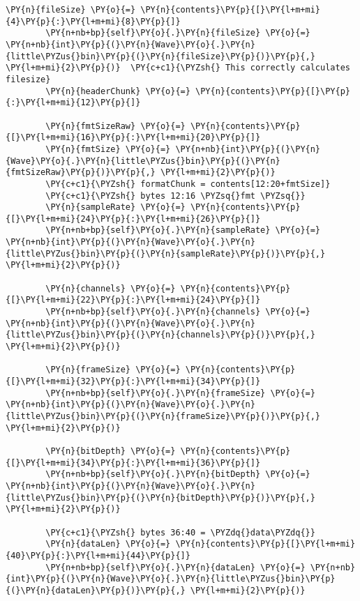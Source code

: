 \begin{Verbatim}[commandchars=\\\{\}]
        \PY{n}{fileSize} \PY{o}{=} \PY{n}{contents}\PY{p}{[}\PY{l+m+mi}{4}\PY{p}{:}\PY{l+m+mi}{8}\PY{p}{]}
        \PY{n+nb+bp}{self}\PY{o}{.}\PY{n}{fileSize} \PY{o}{=} \PY{n+nb}{int}\PY{p}{(}\PY{n}{Wave}\PY{o}{.}\PY{n}{little\PYZus{}bin}\PY{p}{(}\PY{n}{fileSize}\PY{p}{)}\PY{p}{,} \PY{l+m+mi}{2}\PY{p}{)}  \PY{c+c1}{\PYZsh{} This correctly calculates filesize}
        \PY{n}{headerChunk} \PY{o}{=} \PY{n}{contents}\PY{p}{[}\PY{p}{:}\PY{l+m+mi}{12}\PY{p}{]}

        \PY{n}{fmtSizeRaw} \PY{o}{=} \PY{n}{contents}\PY{p}{[}\PY{l+m+mi}{16}\PY{p}{:}\PY{l+m+mi}{20}\PY{p}{]}
        \PY{n}{fmtSize} \PY{o}{=} \PY{n+nb}{int}\PY{p}{(}\PY{n}{Wave}\PY{o}{.}\PY{n}{little\PYZus{}bin}\PY{p}{(}\PY{n}{fmtSizeRaw}\PY{p}{)}\PY{p}{,} \PY{l+m+mi}{2}\PY{p}{)}
        \PY{c+c1}{\PYZsh{} formatChunk = contents[12:20+fmtSize]}
        \PY{c+c1}{\PYZsh{} bytes 12:16 \PYZsq{}fmt \PYZsq{}}
        \PY{n}{sampleRate} \PY{o}{=} \PY{n}{contents}\PY{p}{[}\PY{l+m+mi}{24}\PY{p}{:}\PY{l+m+mi}{26}\PY{p}{]}
        \PY{n+nb+bp}{self}\PY{o}{.}\PY{n}{sampleRate} \PY{o}{=} \PY{n+nb}{int}\PY{p}{(}\PY{n}{Wave}\PY{o}{.}\PY{n}{little\PYZus{}bin}\PY{p}{(}\PY{n}{sampleRate}\PY{p}{)}\PY{p}{,} \PY{l+m+mi}{2}\PY{p}{)}

        \PY{n}{channels} \PY{o}{=} \PY{n}{contents}\PY{p}{[}\PY{l+m+mi}{22}\PY{p}{:}\PY{l+m+mi}{24}\PY{p}{]}
        \PY{n+nb+bp}{self}\PY{o}{.}\PY{n}{channels} \PY{o}{=} \PY{n+nb}{int}\PY{p}{(}\PY{n}{Wave}\PY{o}{.}\PY{n}{little\PYZus{}bin}\PY{p}{(}\PY{n}{channels}\PY{p}{)}\PY{p}{,} \PY{l+m+mi}{2}\PY{p}{)}

        \PY{n}{frameSize} \PY{o}{=} \PY{n}{contents}\PY{p}{[}\PY{l+m+mi}{32}\PY{p}{:}\PY{l+m+mi}{34}\PY{p}{]}
        \PY{n+nb+bp}{self}\PY{o}{.}\PY{n}{frameSize} \PY{o}{=} \PY{n+nb}{int}\PY{p}{(}\PY{n}{Wave}\PY{o}{.}\PY{n}{little\PYZus{}bin}\PY{p}{(}\PY{n}{frameSize}\PY{p}{)}\PY{p}{,} \PY{l+m+mi}{2}\PY{p}{)}

        \PY{n}{bitDepth} \PY{o}{=} \PY{n}{contents}\PY{p}{[}\PY{l+m+mi}{34}\PY{p}{:}\PY{l+m+mi}{36}\PY{p}{]}
        \PY{n+nb+bp}{self}\PY{o}{.}\PY{n}{bitDepth} \PY{o}{=} \PY{n+nb}{int}\PY{p}{(}\PY{n}{Wave}\PY{o}{.}\PY{n}{little\PYZus{}bin}\PY{p}{(}\PY{n}{bitDepth}\PY{p}{)}\PY{p}{,} \PY{l+m+mi}{2}\PY{p}{)}

        \PY{c+c1}{\PYZsh{} bytes 36:40 = \PYZdq{}data\PYZdq{}}
        \PY{n}{dataLen} \PY{o}{=} \PY{n}{contents}\PY{p}{[}\PY{l+m+mi}{40}\PY{p}{:}\PY{l+m+mi}{44}\PY{p}{]}
        \PY{n+nb+bp}{self}\PY{o}{.}\PY{n}{dataLen} \PY{o}{=} \PY{n+nb}{int}\PY{p}{(}\PY{n}{Wave}\PY{o}{.}\PY{n}{little\PYZus{}bin}\PY{p}{(}\PY{n}{dataLen}\PY{p}{)}\PY{p}{,} \PY{l+m+mi}{2}\PY{p}{)}


\end{Verbatim}
